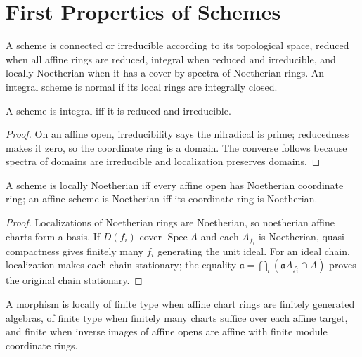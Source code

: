 \section{First Properties of Schemes}

\begin{definition}
\label{def:II-3-properties}
A scheme is connected or irreducible according to its topological space, reduced when all affine
rings are reduced, integral when reduced and irreducible, and locally Noetherian when it has a cover
by spectra of Noetherian rings. An integral scheme is normal if its local rings are integrally closed.
\end{definition}

\begin{proposition}
\label{prop:II-3-1}
A scheme is integral iff it is reduced and irreducible.
\end{proposition}
\begin{proof}
On an affine open, irreducibility says the nilradical is prime; reducedness makes it zero, so the
coordinate ring is a domain. The converse follows because spectra of domains are irreducible and
localization preserves domains.
\end{proof}

\begin{proposition}
\label{prop:II-3-2}
A scheme is locally Noetherian iff every affine open has Noetherian coordinate ring; an affine scheme
is Noetherian iff its coordinate ring is Noetherian.
\end{proposition}
\begin{proof}
Localizations of Noetherian rings are Noetherian, so noetherian affine charts form a basis. If
$D(f_i)$ cover $\operatorname{Spec}A$ and each $A_{f_i}$ is Noetherian, quasi-compactness gives finitely
many $f_i$ generating the unit ideal. For an ideal chain, localization makes each chain stationary;
the equality $\mathfrak a=\bigcap_i(\mathfrak a A_{f_i}\cap A)$ proves the original chain stationary.
\end{proof}

\begin{definition}
\label{def:II-3-finite-type}
A morphism is locally of finite type when affine chart rings are finitely generated algebras, of
finite type when finitely many charts suffice over each affine target, and finite when inverse images
of affine opens are affine with finite module coordinate rings.
\end{definition}

